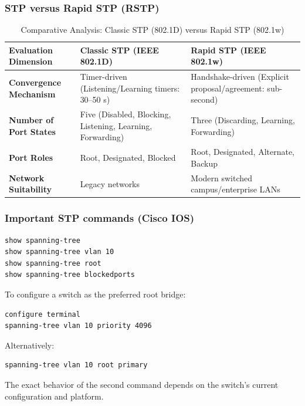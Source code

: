 \subsubsection{STP versus Rapid STP (RSTP)}
\begin{table}[htbp]
\centering
\caption{Comparative Analysis: Classic STP (802.1D) versus Rapid STP (802.1w)}
\label{tab:stp_vs_rstp}
\begin{tabularx}{\textwidth}{p{3.5cm} X X}
\toprule
\textbf{Evaluation Dimension} & \textbf{Classic STP (IEEE 802.1D)} & \textbf{Rapid STP (IEEE 802.1w)} \\
\midrule
\textbf{Convergence Mechanism} & Timer-driven (Listening/Learning timers: 30--50 s) & Handshake-driven (Explicit proposal/agreement: sub-second) \\
\textbf{Number of Port States} & Five (Disabled, Blocking, Listening, Learning, Forwarding) & Three (Discarding, Learning, Forwarding) \\
\textbf{Port Roles} & Root, Designated, Blocked & Root, Designated, Alternate, Backup \\
\textbf{Network Suitability} & Legacy networks & Modern switched campus/enterprise LANs \\
\bottomrule
\end{tabularx}
\end{table}


\subsubsection{Important STP commands (Cisco IOS)}

\begin{lstlisting}
show spanning-tree
show spanning-tree vlan 10
show spanning-tree root
show spanning-tree blockedports
\end{lstlisting}

To configure a switch as the preferred root bridge:

\begin{lstlisting}
configure terminal
spanning-tree vlan 10 priority 4096
\end{lstlisting}

Alternatively:

\begin{lstlisting}
spanning-tree vlan 10 root primary
\end{lstlisting}

The exact behavior of the second command depends on the switch's current configuration and platform.


